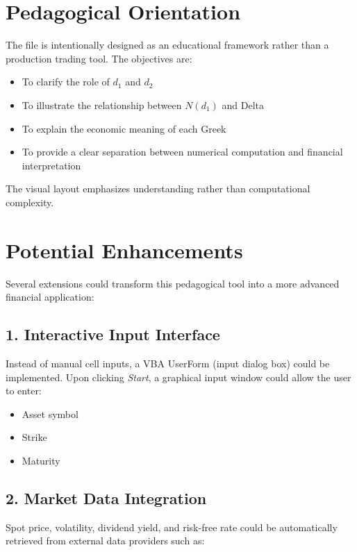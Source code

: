 \documentclass[12pt]{article}
\begin{document}
\section{Pedagogical Orientation}

The file is intentionally designed as an educational framework rather than a production trading tool. The objectives are:

\begin{itemize}
    \item To clarify the role of $d_1$ and $d_2$
    \item To illustrate the relationship between $N(d_1)$ and Delta
    \item To explain the economic meaning of each Greek
    \item To provide a clear separation between numerical computation and financial interpretation
\end{itemize}

The visual layout emphasizes understanding rather than computational complexity.

\section{Potential Enhancements}

Several extensions could transform this pedagogical tool into a more advanced financial application:

\subsection*{1. Interactive Input Interface}

Instead of manual cell inputs, a VBA UserForm (input dialog box) could be implemented. Upon clicking \textit{Start}, a graphical input window could allow the user to enter:

\begin{itemize}
    \item Asset symbol
    \item Strike
    \item Maturity
\end{itemize}

\subsection*{2. Market Data Integration}

Spot price, volatility, dividend yield, and risk-free rate could be automatically retrieved from external data providers such as:
\end{document}
